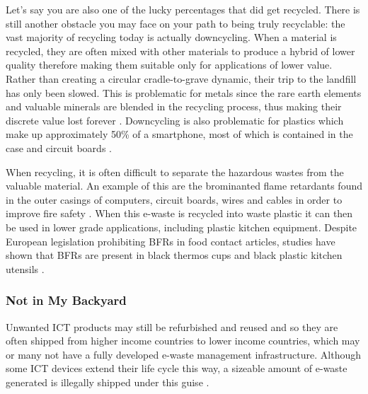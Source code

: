 \documentclass{article}
\begin{document}
Let's say you are also one of the lucky percentages that did get recycled. There is still another obstacle you may face on your path to being truly recyclable: the vast majority of recycling today is actually downcycling. When a material is recycled, they are often mixed with other materials to produce a hybrid of lower quality therefore making them suitable only for applications of lower value. Rather than creating a circular cradle-to-grave dynamic, their trip to the landfill has only been slowed. This is problematic for metals since the rare earth elements and valuable minerals are blended in the recycling process, thus making their discrete value lost forever \cite{braungart2007cradle}. Downcycling is also problematic for plastics which make up approximately 50\% of a smartphone, most of which is contained in the case and circuit boards \cite{bournay2006vital}.

When recycling, it is often difficult to separate the hazardous wastes from the valuable material. An example of this are the brominanted flame retardants found in the outer casings of computers, circuit boards, wires and cables in order to improve fire safety \cite{williams2011environmental, forti2020global}. When this e-waste is recycled into waste plastic it can then be used in lower grade applications, including plastic kitchen equipment. Despite European legislation prohibiting BFRs in food contact articles, studies have shown that BFRs are present in black thermos cups and black plastic kitchen utensils \cite{samsonek2013occurrence}.


\subsubsection{Not in My Backyard}

Unwanted ICT products may still be refurbished and reused and so they are often shipped from higher income countries to lower income countries, which may or many not have a fully developed e-waste management infrastructure. Although some ICT devices extend their life cycle this way, a sizeable amount of e-waste generated is illegally shipped under this guise \cite{forti2020global}. %
\end{document}
